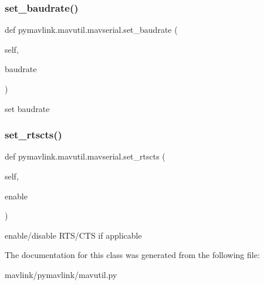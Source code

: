 \subsubsection{\texorpdfstring{set\+\_\+baudrate()}{set\_baudrate()}}
{\footnotesize\ttfamily def pymavlink.\+mavutil.\+mavserial.\+set\+\_\+baudrate (\begin{DoxyParamCaption}\item[{}]{self,  }\item[{}]{baudrate }\end{DoxyParamCaption})}

\begin{DoxyVerb}set baudrate\end{DoxyVerb}
 \mbox{\label{classpymavlink_1_1mavutil_1_1mavserial_af4a1da9b197ebf58110e26b805af1fda}} 
\subsubsection{\texorpdfstring{set\+\_\+rtscts()}{set\_rtscts()}}
{\footnotesize\ttfamily def pymavlink.\+mavutil.\+mavserial.\+set\+\_\+rtscts (\begin{DoxyParamCaption}\item[{}]{self,  }\item[{}]{enable }\end{DoxyParamCaption})}

\begin{DoxyVerb}enable/disable RTS/CTS if applicable\end{DoxyVerb}
 

The documentation for this class was generated from the following file\+:\begin{DoxyCompactItemize}
\item 
mavlink/pymavlink/mavutil.\+py\end{DoxyCompactItemize}

